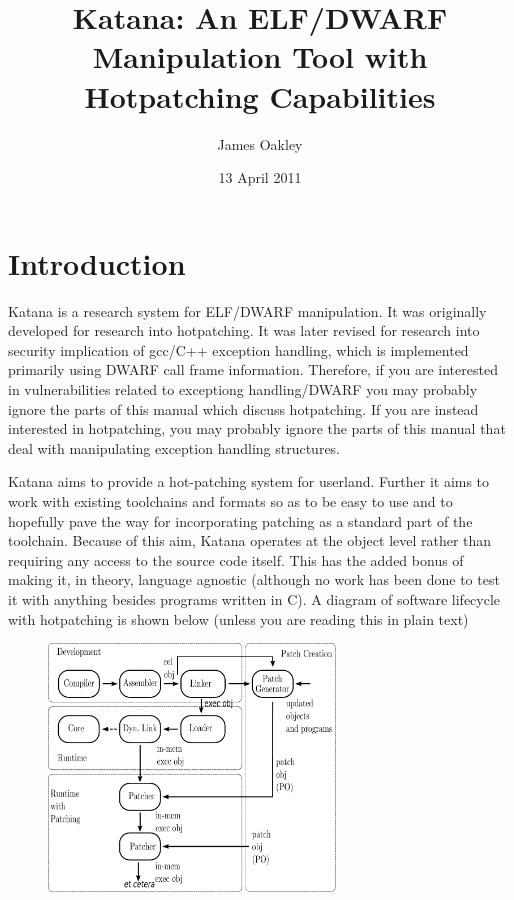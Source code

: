 \documentclass[11pt]{article}
\title{Katana: An ELF/DWARF Manipulation Tool with Hotpatching Capabilities}
\author{James Oakley}
\date{13 April 2011}
\begin{document}
\maketitle

\setcounter{tocdepth}{3}
\tableofcontents
\vspace*{1cm}


\section{Introduction}
\label{sec-1}

  Katana is a research system for ELF/DWARF manipulation. It was
  originally developed for research into hotpatching. It was later
  revised for research into security implication of gcc/C++ exception
  handling, which is implemented primarily using DWARF call frame
  information. Therefore, if you are interested in vulnerabilities
  related to exceptiong handling/DWARF you may probably ignore the
  parts of this manual which discuss hotpatching. If you are instead
  interested in hotpatching, you may probably ignore the parts of this
  manual that deal with manipulating exception handling structures.
  
  Katana aims to provide a hot-patching system for userland. Further
  it aims to work with existing toolchains and formats so as to be
  easy to use and to hopefully pave the way for incorporating patching
  as a standard part of the toolchain. Because of this aim, Katana
  operates at the object level rather than requiring any access to the
  source code itself. This has the added bonus of making it, in
  theory, language agnostic (although no work has been done to test it
  with anything besides programs written in C). A diagram of software
  lifecycle with hotpatching is shown below (unless you are reading this in plain text)


\begin{figure}[h!]
\includegraphics[width=3in]{./softwarelifecycle.pdf}
\end{figure}
\end{document}
